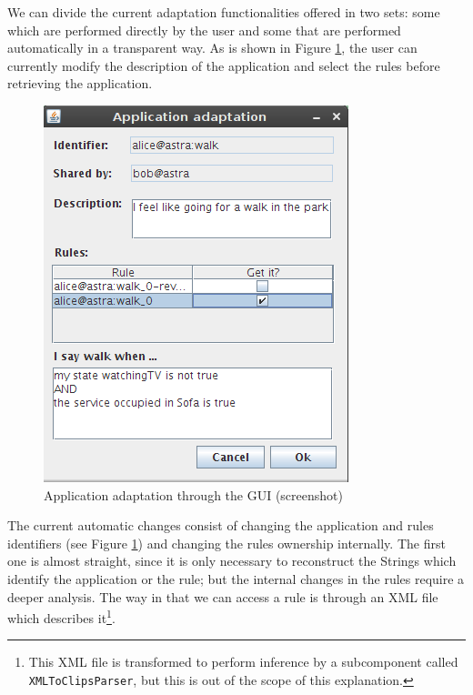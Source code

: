 We can divide the current adaptation functionalities offered in two sets: some
which are performed directly by the user and some that are performed
automatically in a transparent way.
\newline
As is shown in Figure \ref{img:application-adaptation}, the user can currently
modify the description of the application and select the rules before
retrieving the application.

\begin{figure}[h!]
 \begin{center}

 \includegraphics[scale=0.5]{screenshots/application-adaptation-retrieving.png}
  \caption{\label{img:application-adaptation}Application adaptation through the
  GUI (screenshot)}
 \end{center}
\end{figure}

The current automatic changes consist of changing the application and rules
identifiers (see Figure \ref{img:application-adaptation}) and changing
the rules ownership internally. The first one is almost straight, since it is
only necessary to reconstruct the Strings which identify the application or the
rule; but the internal changes in the rules require a deeper analysis.
\newline
The way in that we can access a rule is through an XML file which describes
it\footnote{This XML file is transformed to perform inference by
a subcomponent called \texttt{XMLToClipsParser}, but this is out of the scope of this
explanation.}.

